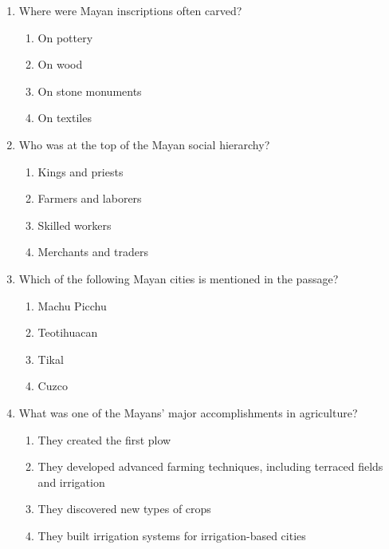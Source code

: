 \documentclass[12pt]{article}
\begin{document}
\begin{enumerate}
\vspace{0.5cm}

\item Where were Mayan inscriptions often carved?
\begin{enumerate}[label=\Alph*.]
    \item On pottery
    \item On wood
    \item On stone monuments
    \item On textiles
\end{enumerate}

\vspace{0.5cm}

\item Who was at the top of the Mayan social hierarchy?
\begin{enumerate}[label=\Alph*.]
    \item Kings and priests
    \item Farmers and laborers
    \item Skilled workers
    \item Merchants and traders
\end{enumerate}

\vspace{0.5cm}

\item Which of the following Mayan cities is mentioned in the passage?
\begin{enumerate}[label=\Alph*.]
    \item Machu Picchu
    \item Teotihuacan
    \item Tikal
    \item Cuzco
\end{enumerate}

\vspace{0.5cm}

\item What was one of the Mayans' major accomplishments in agriculture?
\begin{enumerate}[label=\Alph*.]
    \item They created the first plow
    \item They developed advanced farming techniques, including terraced fields and irrigation
    \item They discovered new types of crops
    \item They built irrigation systems for irrigation-based cities
\end{enumerate}


\end{enumerate}
\end{document}
